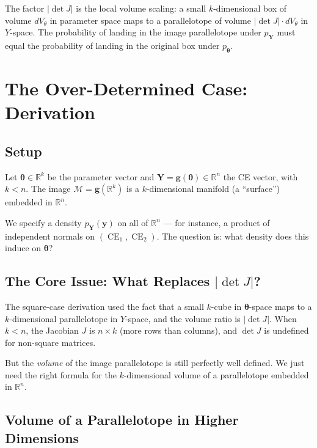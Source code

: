 \documentclass[11pt,a4paper]{article}
\theoremstyle{definition}
\newcommand{\btheta}{\boldsymbol{\theta}}
\DeclareMathOperator{\CE}{CE}
\begin{document}
The factor $|\!\det J|$ is the local volume scaling: a small $k$-dimensional
box of volume $dV_\theta$ in parameter space maps to a parallelotope of volume
$|\!\det J| \cdot dV_\theta$ in $Y$-space. The probability of landing in the
image parallelotope under $p_{\mathbf{Y}}$ must equal the probability of
landing in the original box under $p_{\btheta}$.


\section{The Over-Determined Case: Derivation}
\label{sec:derivation}

\subsection{Setup}

Let $\btheta \in \mathbb{R}^k$ be the parameter vector and
$\mathbf{Y} = \mathbf{g}(\btheta) \in \mathbb{R}^n$ the CE vector, with
$k < n$. The image $\mathcal{M} = \mathbf{g}(\mathbb{R}^k)$ is a
$k$-dimensional manifold (a ``surface'') embedded in $\mathbb{R}^n$.

We specify a density $p_{\mathbf{Y}}(\mathbf{y})$ on all of $\mathbb{R}^n$
--- for instance, a product of independent normals on $(\CE_1, \CE_2)$. The
question is: what density does this induce on $\btheta$?

\subsection{The Core Issue: What Replaces \texorpdfstring{$|\!\det J|$}{|det J|}?}

The square-case derivation used the fact that a small $k$-cube in
$\btheta$-space maps to a $k$-dimensional parallelotope in $Y$-space, and the
volume ratio is $|\!\det J|$. When $k < n$, the Jacobian $J$ is $n \times k$
(more rows than columns), and $\det J$ is undefined for non-square matrices.

But the \emph{volume} of the image parallelotope is still perfectly well
defined. We just need the right formula for the $k$-dimensional volume of a
parallelotope embedded in $\mathbb{R}^n$.

\subsection{Volume of a Parallelotope in Higher Dimensions}
\end{document}
